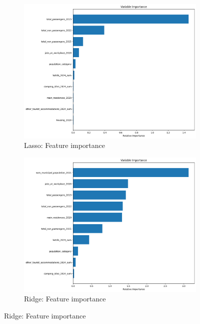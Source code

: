 \begin{figure}[h]
    \centering
    \begin{subfigure}[b]{0.3\textwidth}
         \centering
         \includegraphics[width=\textwidth]{assets/images/feature-importance-lasso.png}
         \caption{Lasso: Feature importance}
     \end{subfigure}
    \hfill
     \begin{subfigure}[b]{0.3\textwidth}
         \centering
         \includegraphics[width=\textwidth]{assets/images/simple-linear-regression-feature-importance.png}
         \caption{Ridge: Feature importance}
     \end{subfigure}

\end{figure}
